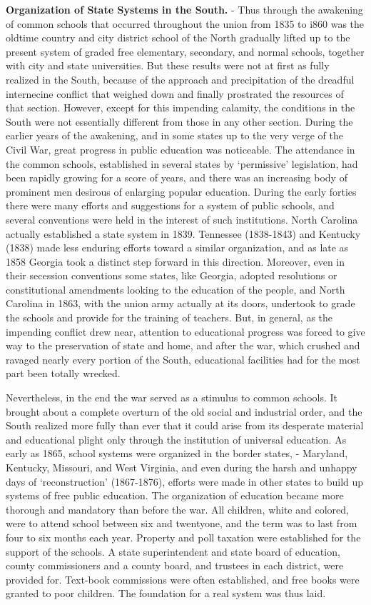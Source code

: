\documentclass[]{book}
\begin{document}
\textbf{Organization of State Systems in the South.} - Thus through the awakening of common schools that occurred throughout the union from 1835 to i860 was the oldtime country and city district school of the North gradually lifted up to the present system of graded free elementary, secondary, and normal schools, together with city and state universities. But these results were not at first as fully realized in the South, because of the approach and precipitation of the dreadful internecine conflict that weighed down and finally prostrated the resources of that section. However, except for this impending calamity, the conditions in the South were not essentially different from those in any other section. During the earlier years of the awakening, and in some states up to the very verge of the Civil War, great progress in public education was noticeable. The attendance in the common schools, established in several states by `permissive' legislation, had been rapidly growing for a score of years, and there was an increasing body of prominent men desirous of enlarging popular education. During the early forties there were many efforts and suggestions for a system of public schools, and several conventions were held in the interest of such institutions. North Carolina actually established a state system in 1839. Tennessee (1838-1843) and Kentucky (1838) made less enduring efforts toward a similar organization, and as late as 1858 Georgia took a distinct step forward in this direction. Moreover, even in their secession conventions some states, like Georgia, adopted resolutions or constitutional amendments looking to the education of the people, and North Carolina in 1863, with the union army actually at its doors, undertook to grade the schools and provide for the training of teachers. But, in general, as the impending conflict drew near, attention to educational progress was forced to give way to the preservation of state and home, and after the war, which crushed and ravaged nearly every portion of the South, educational facilities had for the most part been totally wrecked.

Nevertheless, in the end the war served as a stimulus to common schools. It brought about a complete overturn of the old social and industrial order, and the South realized more fully than ever that it could arise from its desperate material and educational plight only through the institution of universal education. As early as 1865, school systems were organized in the border states, - Maryland, Kentucky, Missouri, and West Virginia, and even during the harsh and unhappy days of `reconstruction' (1867-1876), efforts were made in other states to build up systems of free public education. The organization of education became more thorough and mandatory than before the war. All children, white and colored, were to attend school between six and twentyone, and the term was to last from four to six months each year. Property and poll taxation were established for the support of the schools. A state superintendent and state board of education, county commissioners and a county board, and trustees in each district, were provided for. Text-book commissions were often established, and free books were granted to poor children. The foundation for a real system was thus laid.
\end{document}
